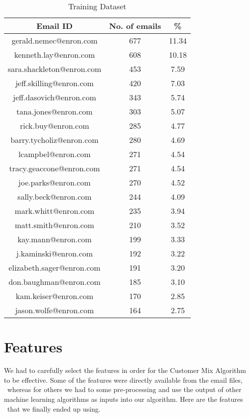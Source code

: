 \documentclass[senior,oneside]{UIUC}
\begin{document}
\begin{table}[!ht]
\center
\begin{tabular}{c c c }
\hline \hline
Email ID & No. of emails & \% \\
\hline
gerald.nemec@enron.com & 677 & 11.34 \\
kenneth.lay@enron.com & 608 & 10.18 \\
sara.shackleton@enron.com & 453 & 7.59 \\
jeff.skilling@enron.com & 420 & 7.03 \\
jeff.dasovich@enron.com & 343 & 5.74 \\
tana.jones@enron.com & 303 & 5.07 \\
rick.buy@enron.com & 285 & 4.77 \\
barry.tycholiz@enron.com & 280 & 4.69 \\
lcampbel@enron.com & 271 & 4.54 \\
tracy.geaccone@enron.com & 271 & 4.54 \\
joe.parks@enron.com & 270 & 4.52 \\
sally.beck@enron.com & 244 & 4.09 \\
mark.whitt@enron.com & 235 & 3.94 \\
matt.smith@enron.com & 210 & 3.52 \\
kay.mann@enron.com & 199 & 3.33 \\
j.kaminski@enron.com & 192 & 3.22 \\
elizabeth.sager@enron.com & 191 & 3.20 \\
don.baughman@enron.com & 185 & 3.10 \\
kam.keiser@enron.com & 170 & 2.85 \\
jason.wolfe@enron.com & 164 & 2.75 \\
\end{tabular}
\caption{Training Dataset}
\label{table:training-data}
\end{table}


\chapter{Features}
\label{chap:features}

We had to carefully select the features in order for the Customer Mix Algorithm to be effective. Some of the features were directly available from the email files, \
whereas for others we had to some pre-processing and use the output of other machine learning algorithms as inputs into our algorithm. Here are the features \
that we finally ended up using.
\end{document}
